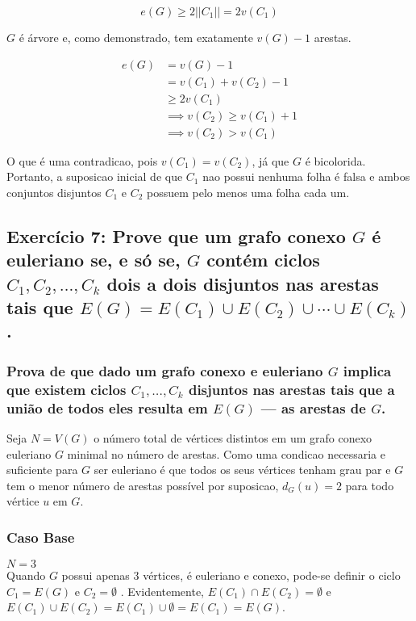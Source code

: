 \documentclass{article}
\begin{document}
$$
e(G) \geq 2 || C_1 || = 2v(C_1)
$$

$G$ é árvore e, como demonstrado, tem exatamente $v(G) - 1$ arestas. 

 \begin{align*}
	e(G) &= v(G) - 1  \\
	        &= v(C_1) + v(C_2) - 1 \\
	        &\geq 2v(C_1) \\
	        &\implies v(C_2) \geq v(C_1) + 1 \\
	        &\implies v(C_2) >  v(C_1)  
\end{align*}

O que é uma contradicao, pois $v(C_1) = v(C_2)$, já que $G$ é bicolorida. Portanto, a suposicao inicial de que $C_1$ nao possui nenhuma folha é falsa e ambos conjuntos disjuntos $C_1$ e $C_2$ possuem pelo menos uma folha cada um.

 \clearpage
 
 \subsection{Exercício 7: Prove que um grafo conexo $G$ é euleriano se, e só se, $G$ contém ciclos $C_1, C_2, \ldots, C_k$ dois a dois disjuntos nas arestas tais que $E(G) = E(C_1) \cup E(C_2) \cup \cdots \cup E(C_k)$.}

\subsubsection{Prova  de que dado um grafo conexo e euleriano $G$ implica que existem ciclos $C_1, \ldots, C_k$ disjuntos nas arestas tais que a união de todos eles resulta em $E(G)$ — as arestas de $G$.}

Seja $N = V(G)$ o número total de vértices distintos em um grafo conexo euleriano $G$ minimal no número de arestas. Como uma condicao necessaria e suficiente para $G$ ser euleriano é que todos os seus vértices tenham grau par e $G$ tem o menor número de arestas possível por suposicao, $d_G(u) = 2$ para todo vértice $u$ em $G$. 

\subsubsection*{Caso Base}
$N = 3$ \\
Quando $G$ possui apenas 3 vértices, é euleriano e conexo, pode-se definir o ciclo  $C_1 = E(G)$ e $C_2 = \emptyset$ . Evidentemente, $E(C_1) \cap E(C_2) = \emptyset$ e $E(C_1) \cup E(C_2) = E(C_1) \cup \emptyset = E(C_1) = E(G)$.
\end{document}

